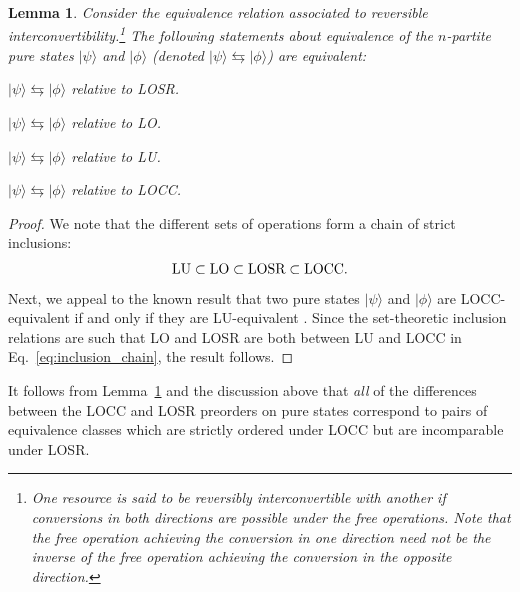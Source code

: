 \documentclass[12pt]{article}
\newcommand{\LOSR}[0]{\ifmmode\textup{\upshape LOSR}\else{\textup{\upshape LOSR}}\fi}
\newcommand{\LO}[0]{\ifmmode\textup{\upshape LO}\else{\textup{\upshape LO}}\fi}
\newcommand{\LOCC}[0]{\ifmmode\textup{\upshape LOCC}\else{\textup{\upshape LOCC}}\fi}
\newcommand{\LU}[0]{\ifmmode\textup{\upshape LU}\else{\textup{\upshape LU}}\fi}
\theoremstyle{plain}
\newtheorem{lem}[theo]{Lemma}
\theoremstyle{definition}
\begin{document}
\begin{lem}
    \label{lem:equivalence}
    Consider the equivalence relation associated to reversible     interconvertibility.\footnote{One resource is said to be {\em reversibly interconvertibl}e with another if conversions in both directions are possible under the free operations.  Note that the free operation achieving the conversion in one direction need not be the inverse of the free operation achieving the conversion in the opposite direction. }
    The following statements about equivalence of the $n$-partite pure states $|\psi\rangle$ and $|\phi\rangle$  (denoted $|\psi\rangle \leftrightarrows |\phi\rangle$) are equivalent:
    \begin{compactenum}[(i)]
        \item  $|\psi\rangle \leftrightarrows |\phi\rangle$ relative to LOSR.
        \item  $|\psi\rangle \leftrightarrows |\phi\rangle$ relative to LO.
        \item  $|\psi\rangle \leftrightarrows |\phi\rangle$ relative to LU.
        \item  $|\psi\rangle \leftrightarrows |\phi\rangle$ relative to LOCC.
    \end{compactenum}
\end{lem}



\begin{proof}
We note that the different sets of operations 
 form a chain of strict inclusions:
    \begin{align}
        \label{eq:inclusion_chain}
        \LU \subset \LO \subset \LOSR \subset \LOCC.
    \end{align}
Next, we appeal to the known result
  that two pure states $|\psi\rangle$ and $|\phi\rangle$
     are LOCC-equivalent if and only if they are LU-equivalent \cite{bennett2000exact}. Since the set-theoretic inclusion relations are such that LO and LOSR are both between LU and LOCC in Eq.~\eqref{eq:inclusion_chain}, the result follows. 
\end{proof}

It follows from Lemma~\ref{lem:equivalence} and the discussion above that {\em all} of the differences between the LOCC and LOSR preorders on pure states correspond to pairs of equivalence classes which are strictly ordered under LOCC but are incomparable under LOSR.
\end{document}
